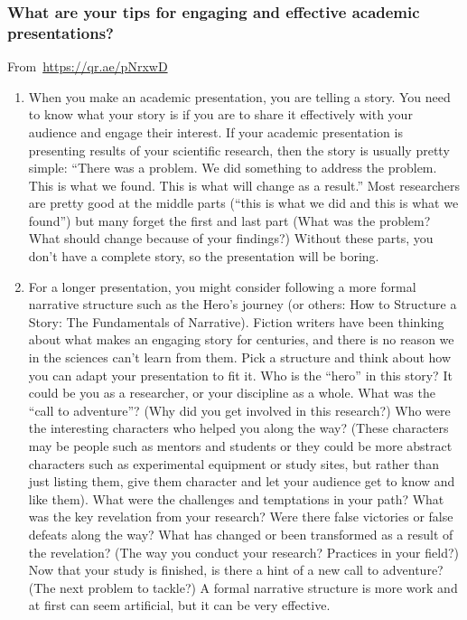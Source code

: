 \documentclass{beamer}
\begin{document}
\begin{frame}
  \frametitle{What are your tips for engaging and effective academic presentations?
}
From~\url{https://qr.ae/pNrxwD}

\begin{enumerate}
\item When you make an academic presentation, you are telling a story. You need to know what your story is if you are to share it effectively with your audience and engage their interest. If your academic presentation is presenting results of your scientific research, then the story is usually pretty simple: ``There was a problem. We did something to address the problem. This is what we found. This is what will change as a result.'' Most researchers are pretty good at the middle parts (``this is what we did and this is what we found'') but many forget the first and last part (What was the problem? What should change because of your findings?) Without these parts, you don’t have a complete story, so the presentation will be boring.

\item For a longer presentation, you might consider following a more formal narrative structure such as the Hero's journey (or others: How to Structure a Story: The Fundamentals of Narrative). Fiction writers have been thinking about what makes an engaging story for centuries, and there is no reason we in the sciences can’t learn from them. Pick a structure and think about how you can adapt your presentation to fit it. Who is the ``hero'' in this story? It could be you as a researcher, or your discipline as a whole. What was the ``call to adventure''? (Why did you get involved in this research?) Who were the interesting characters who helped you along the way? (These characters may be people such as mentors and students or they could be more abstract characters such as experimental equipment or study sites, but rather than just listing them, give them character and let your audience get to know and like them). What were the challenges and temptations in your path? What was the key revelation from your research? Were there false victories or false defeats along the way? What has changed or been transformed as a result of the revelation? (The way you conduct your research? Practices in your field?) Now that your study is finished, is there a hint of a new call to adventure? (The next problem to tackle?) A formal narrative structure is more work and at first can seem artificial, but it can be very effective.


\end{enumerate}
\end{frame}
\end{document}
